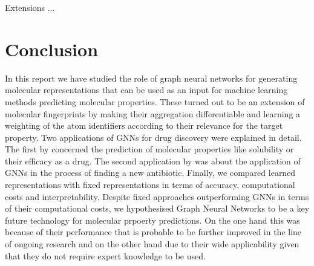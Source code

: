 Extensions ...
\section{Conclusion}
In this report we have studied the role of graph neural networks for generating molecular representations that can be used as an input for machine learning methods predicting molecular properties. These turned out to be an extension of molecular fingerprints by making their aggregation differentiable and learning a weighting of the atom identifiers according to their relevance for the target property.
Two applications of GNNs for drug discovery were explained in detail. The first by \cite{duvenaud2015convolutional} concerned the prediction of molecular properties like solubility or their efficacy as a drug. The second application by \cite{STOKES2020688} was about the application of GNNs in the process of finding a new antibiotic. 
Finally, we compared learned representations with fixed representations in terms of accuracy, computational costs and interpretability. Despite fixed approaches outperforming GNNs in terms of their computational costs, we hypothesised Graph Neural Networks to be a key future technology for molecular prpoerty predictions. On the one hand this was because of their performance that is probable to be further improved in the line of ongoing research and on the other hand due to their wide applicability given that they do not require expert knowledge to be used. 